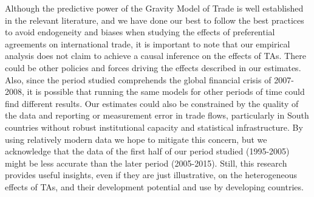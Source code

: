Although the predictive power of the Gravity Model of Trade is well
established in the relevant literature, and we have done our best to
follow the best practices to avoid endogeneity and biases when studying the effects
of preferential agreements on international trade, it is important to
note that our empirical analysis does not claim to achieve a causal
inference on the effects of TAs. There could be other policies and
forces driving the effects described in our estimates. Also, since the
period studied comprehends the global financial crisis of 2007-2008, it
is possible that running the same models for other periods of time could
find different results. Our estimates could also be constrained by the
quality of the data and reporting or measurement error in trade flows,
particularly in South countries without robust institutional capacity
and statistical infrastructure. By using relatively modern data we hope
to mitigate this concern, but we acknowledge that the data of the first
half of our period studied (1995-2005) might be less accurate than the
later period (2005-2015). Still, this research provides useful insights,
even if they are just illustrative, on the heterogeneous effects of TAs,
and their development potential and use by developing countries.